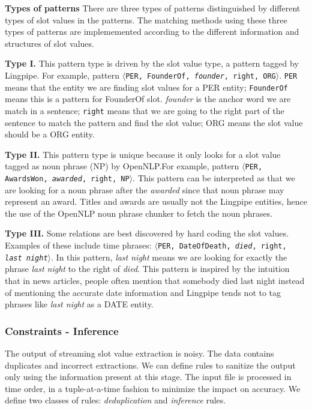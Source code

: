 \textbf{Types of patterns}
There are three types of patterns distinguished by different types of slot values in the patterns. The matching methods using these three types of patterns are implememented according to the different information and structures of slot values.

 
\textbf{Type I.} This pattern type is driven by the slot value type, a pattern tagged by Lingpipe. For example, pattern $\langle$\texttt{PER, FounderOf, \textit{founder}, right, ORG}$\rangle$. \texttt{PER} means 
that the entity we are finding slot values for a PER entity; \texttt{FounderOf} means this is a pattern for FounderOf slot. \textit{founder} is the anchor word we are match in a sentence; \texttt{right} means that we are going to the right part of the sentence to match the pattern and find the slot value; ORG means the slot value should be a ORG entity.

\textbf{Type II.} This pattern type is unique because it only looks for a slot value tagged as noun phrase (NP) by OpenNLP.\@ For example, pattern $\langle$\texttt{PER, AwardsWon, \textit{awarded}, right, NP}$\rangle$. This pattern can be interpreted as that we are looking for a noun phrase after the \textit{awarded} since that noun phrase may represent an award. Titles and awards are usually not the Lingpipe entities, hence the use of the OpenNLP noun phrase chunker to fetch the noun phrases.

\textbf{Type III.} Some relations are best discovered by hard coding the slot values. Examples of these include time phrases: $\langle$\texttt{PER, DateOfDeath, \textit{died}, right, \textit{last night}}$\rangle$. In this pattern, \textit{last night} means we are looking for exactly the phrase \textit{last night} to the right of \textit{died}. This pattern is inspired by the intuition that in news articles, people often mention that somebody died last night instead of mentioning the accurate date information and Lingpipe tends not to tag phrases like \textit{last night} as a DATE entity. 


\subsubsection{Constraints - Inference}

The output of streaming slot value extraction is noisy. The data contains duplicates and incorrect extractions. We can define rules to sanitize the output only using the information present at this stage. The input file is processed in time order, in a tuple-at-a-time fashion to minimize the impact on accuracy. We define two classes of rules: \textit{deduplication} and \textit{inference} rules.

